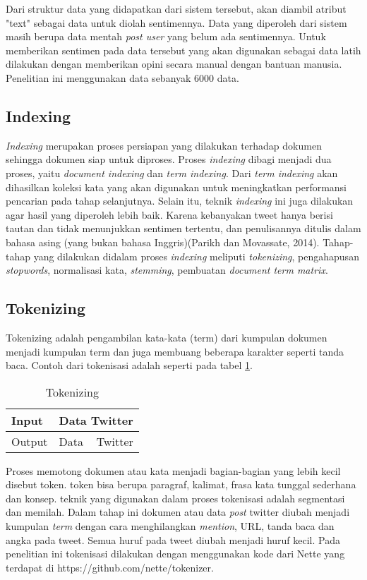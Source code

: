 Dari struktur data yang didapatkan dari sistem tersebut, akan diambil atribut "text" sebagai data untuk diolah sentimennya. Data yang diperoleh dari sistem masih berupa data mentah \textit{post user} yang belum ada sentimennya. Untuk memberikan sentimen pada data tersebut yang akan digunakan sebagai data latih dilakukan dengan memberikan opini secara manual dengan bantuan manusia. Penelitian ini menggunakan data sebanyak 6000 data.


\subsection*{Indexing}

\textit{Indexing} merupakan proses persiapan yang dilakukan terhadap dokumen sehingga dokumen siap untuk diproses. Proses \textit{indexing} dibagi menjadi dua proses, yaitu \textit{document indexing} dan \textit{term indexing}. Dari \textit{term indexing} akan dihasilkan koleksi kata yang akan digunakan untuk meningkatkan performansi pencarian pada tahap selanjutnya.  Selain itu, teknik \textit{indexing} ini juga dilakukan agar hasil yang diperoleh lebih baik. Karena kebanyakan tweet hanya berisi tautan dan tidak menunjukkan sentimen tertentu, dan penulisannya ditulis dalam bahasa asing (yang bukan bahasa Inggris)(Parikh dan Movassate, 2014). Tahap-tahap yang dilakukan didalam proses \textit{indexing} meliputi \textit{tokenizing}, pengahapusan \textit{stopwords}, normalisasi kata, \textit{stemming}, pembuatan \textit{document term matrix}.


\subsection*{Tokenizing}
Tokenizing adalah pengambilan kata-kata (term) dari kumpulan dokumen menjadi kumpulan term dan juga membuang beberapa karakter seperti tanda baca. Contoh dari tokenisasi adalah seperti pada tabel \ref{tab:tokenizing}.

\begin{table}[hbt]
	\caption{Tokenizing}
	\centering
	\begin{tabular}{llr}
		\toprule
		Input & \multicolumn{2}{c}{Data Twitter} \\
		\midrule
		Output & Data & Twitter \\
		\bottomrule
	\end{tabular}
	\label{tab:tokenizing}
\end{table}

Proses memotong dokumen atau kata menjadi bagian-bagian yang lebih kecil disebut token. token bisa berupa paragraf, kalimat, frasa kata tunggal sederhana dan konsep. teknik yang digunakan dalam proses tokenisasi adalah segmentasi dan memilah.
Dalam tahap ini dokumen atau data \textit{post} twitter diubah menjadi kumpulan \textit{term} dengan cara menghilangkan \textit{mention}, URL, tanda baca dan angka pada tweet. Semua huruf pada tweet diubah menjadi huruf kecil. Pada penelitian ini tokenisasi dilakukan dengan menggunakan kode dari Nette yang terdapat di https://github.com/nette/tokenizer.



